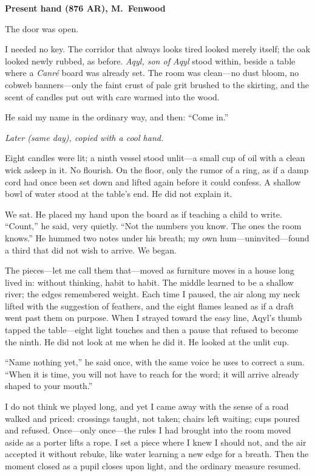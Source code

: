 \documentclass[11pt]{article}
\numberwithin{equation}{section} %
\theoremstyle{plain} %
\theoremstyle{definition} %
\theoremstyle{remark} %
\begin{document}
\noindent\textbf{Present hand (876 AR), M.\ Fenwood}

The door was open.

I needed no key. The corridor that always looks tired looked merely itself; the oak looked newly rubbed, as before. \textit{Aqyl, son of Aqyl} stood within, beside a table where a \emph{Canr\'e} board was already set. The room was clean—no dust bloom, no cobweb banners—only the faint crust of pale grit brushed to the skirting, and the scent of candles put out with care warmed into the wood.

He said my name in the ordinary way, and then: “Come in.”

\medskip
\noindent\textit{Later (same day), copied with a cool hand.}

Eight candles were lit; a ninth vessel stood unlit—a small cup of oil with a clean wick asleep in it. No flourish. On the floor, only the rumor of a ring, as if a damp cord had once been set down and lifted again before it could confess. A shallow bowl of water stood at the table’s end. He did not explain it.

We sat. He placed my hand upon the board as if teaching a child to write. “Count,” he said, very quietly. “Not the numbers you know. The ones the room knows.” He hummed two notes under his breath; my own hum—uninvited—found a third that did not wish to arrive. We began.

The pieces—let me call them that—moved as furniture moves in a house long lived in: without thinking, habit to habit. The middle learned to be a shallow river; the edges remembered weight. Each time I paused, the air along my neck lifted with the suggestion of feathers, and the eight flames leaned as if a draft went past them on purpose. When I strayed toward the easy line, Aqyl’s thumb tapped the table—eight light touches and then a pause that refused to become the ninth. He did not look at me when he did it. He looked at the unlit cup.

“Name nothing yet,” he said once, with the same voice he uses to correct a sum. “When it is time, you will not have to reach for the word; it will arrive already shaped to your mouth.”

I do not think we played long, and yet I came away with the sense of a road walked and priced: crossings taught, not taken; chairs left waiting; cups poured and refused. Once—only once—the rules I had brought into the room moved aside as a porter lifts a rope. I set a piece where I knew I should not, and the air accepted it without rebuke, like water learning a new edge for a breath. Then the moment closed as a pupil closes upon light, and the ordinary measure resumed.
\end{document}
